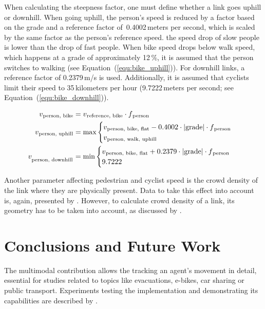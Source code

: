 When calculating the steepness factor, one must define whether a link goes uphill or downhill. When going uphill, the person's speed is reduced by a factor based on the grade and a reference factor of~0.4002\,meters per second, which is scaled by the same factor as the person's reference speed. \ie the speed drop of slow people is lower than the drop of fast people. When bike speed drops below walk speed, which happens at a grade of approximately 12\,\%, it is assumed that the person switches to walking (see Equation~(\ref{equ:bike_uphill})). For downhill links, a reference factor of 0.2379\,m/s is used. Additionally, it is assumed that cyclists limit their speed to 35\,kilometers per hour (9.7222\,meters per second; see Equation~(\ref{equ:bike_downhill})).

{\fontsize{12.8pt}{12}
\begin{align}
    v\textsubscript{person, bike} &= v\textsubscript{reference, bike} \cdot f\textsubscript{person}\\
    v\textsubscript{person, uphill} &= \text{max}
    \begin{cases}
        v\textsubscript{person, bike, flat} - 0.4002 \cdot |\text{grade}| \cdot f\textsubscript{person}\\
        v\textsubscript{person, walk, uphill}
    \end{cases}\label{equ:bike_uphill}\\
    v_{\textsubscript{person, downhill}} &= \text{min}
    \begin{cases}
        v\textsubscript{person, bike, flat} + 0.2379 \cdot |\text{grade}| \cdot f\textsubscript{person}\\
        9.7222
    \end{cases}\label{equ:bike_downhill}
\end{align}
}%

Another parameter affecting pedestrian and cyclist speed is the crowd density of the link where they are physically present. Data to take this effect into account is, again, presented by \citet{Weidmann_TechRep_IVT_1992}. However, to calculate crowd density of a link, its geometry has to be taken into account, as discussed by \citet{Laemmel_PhDThesis_2011}. 

\section{Conclusions and Future Work}
The \gls{multimodal} \gls{contribution} allows the tracking an agent's movement in detail, essential for studies related to topics like evacuations, e-bikes, car sharing or public transport. Experiments testing the implementation and demonstrating its capabilities are described by \citet{Dobler_PhDThesis_2013}.

